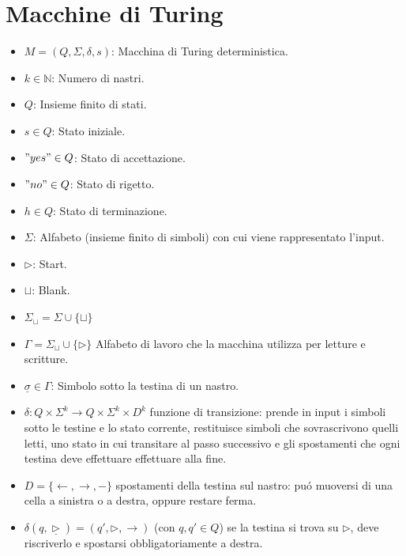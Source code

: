 \section{Macchine di Turing}

\begin{itemize}
    \item $M = (Q, \Sigma, \delta, s)$: Macchina di Turing deterministica.
    \item $k \in \mathbb{N}$: Numero di nastri.
\end{itemize}

\hrulefill

\begin{itemize}
    \item $Q$: Insieme finito di stati.
    \item $s \in Q$: Stato iniziale.
    \item $"yes" \in Q$: Stato di accettazione.
    \item $"no" \in Q$: Stato di rigetto.
    \item $h \in Q$: Stato di terminazione.
\end{itemize}

\hrulefill

\begin{itemize}
    \item $\Sigma$: Alfabeto (insieme finito di simboli) con cui viene rappresentato l'input.
    \item $\triangleright$: Start.
    \item $\sqcup$: Blank.
    \item $\Sigma_\sqcup = \Sigma \cup \{\sqcup\}$
    \item $\Gamma = \Sigma_\sqcup \cup \{\triangleright\}$ Alfabeto di lavoro che la macchina utilizza per letture e scritture.
    \item $\underline{\sigma} \in \Gamma$: Simbolo sotto la testina di un nastro.
\end{itemize}

\hrulefill

\begin{itemize}
    \item $\delta: Q \times \Sigma^k \rightarrow Q \times \Sigma^k \times D^k$ funzione di transizione: prende in input i simboli sotto le testine e lo stato corrente, restituisce simboli che sovrascrivono quelli letti, uno stato in cui transitare al passo successivo e gli spostamenti che ogni testina deve effettuare effettuare alla fine.
    \item $D = \{\leftarrow, \rightarrow, -\}$ spostamenti della testina sul nastro: puó muoversi di una cella a sinistra o a destra, oppure restare ferma.
    \item $\delta(q, \underline{\triangleright}) = (q', \triangleright, \rightarrow)$ (con $q, q' \in Q$) se la testina si trova su $\triangleright$, deve riscriverlo e spostarsi obbligatoriamente a destra.
\end{itemize}

